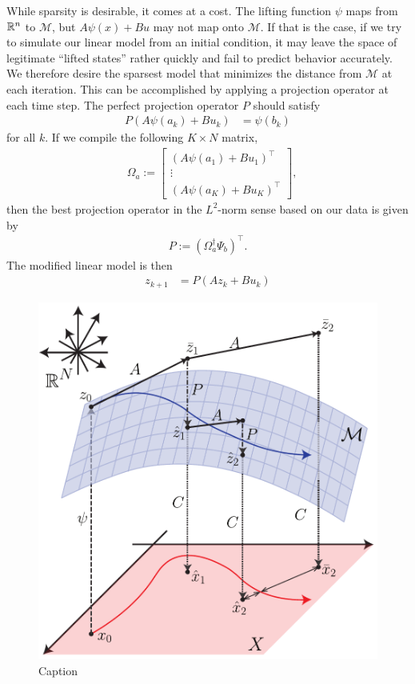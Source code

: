 While sparsity is desirable, it comes at a cost.
The lifting function $\psi$ maps from $\mathbb{R}^n$ to $\mathcal{M}$, but $A\psi(x) + B u$ may not map onto $\mathcal{M}$.
If that is the case, if we try to simulate our linear model from an initial condition, it may leave the space of legitimate ``lifted states'' rather quickly and fail to predict behavior accurately.
We therefore desire the sparsest model that minimizes the distance from $\mathcal{M}$ at each iteration.
This can be accomplished by applying a projection operator at each time step.
The perfect projection operator $P$ should satisfy
\begin{align}
    P \left( A {\psi}(a_k) + B u_k \right) &= \psi(b_k)
\end{align}
for all $k$. 
If we compile the following $K \times N$ matrix,
\begin{align}
    &\Omega_a := \begin{bmatrix} \left( A {\psi}(a_1) + B u_1 \right)^\top \\ \vdots \\  \left( A {\psi}(a_K) + B u_K \right)^\top \end{bmatrix},
    \label{eq:Omega}
\end{align}
then the best projection operator in the $L^2$-norm sense based on our data is given by
\begin{align}
    P := \left( \Omega_{a}^\dagger \Psi_b \right)^\top.
\end{align}
The modified linear model is then 
\begin{align}
    z_{k+1} &= P \left( A z_k + B u_k \right)
    \label{eq:linSys_wP}
\end{align}


\begin{figure}
    \centering
    \includegraphics[width=0.9\linewidth]{figures/liftingManifold_v16.pdf}
    \caption{Caption}
    \label{fig:manifold}
\end{figure}